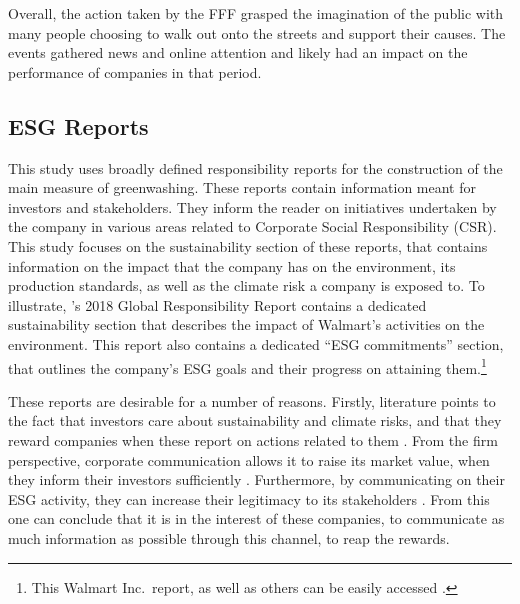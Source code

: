 \documentclass[12pt]{article}
\begin{document}
Overall, the action taken by the FFF grasped the imagination of the public with many people choosing to walk out onto the streets and support their causes. The events gathered news and online attention and likely had an impact on the performance of companies in that period.


\subsection{ESG Reports}


This study uses broadly defined responsibility reports for the construction of the main measure of greenwashing. These reports contain information meant for investors and stakeholders. They inform the reader on initiatives undertaken by the company in various areas related to Corporate Social Responsibility (CSR). This study focuses on the sustainability section of these reports, that contains information on the impact that the company has on the environment, its production standards, as well as the climate risk a company is exposed to. To illustrate, \citeauthor{walmart2018csr}'s 2018 Global Responsibility Report contains a dedicated sustainability section that describes the impact of Walmart's activities on the environment. This report also contains a dedicated ``ESG commitments'' section, that outlines the company's ESG goals and their progress on attaining them.\footnote{This Walmart Inc.~report, as well as others can be easily accessed \href{https://www.responsibilityreports.com/Company/walmart-inc}{}.}

These reports are desirable for a number of reasons. Firstly, literature points to the fact that investors care about sustainability and climate risks, and that they reward companies when these report on actions related to them \parencite{ilhanClimateRiskDisclosure2023,kruegerImportanceClimateRisks2020,pastorSustainableInvestingEquilibrium2021,testaDoesItPay2018}. From the firm perspective, corporate communication allows it to raise its market value, when they inform their investors sufficiently \parencite{servaesImpactCorporateSocial2013}. Furthermore, by communicating on their ESG activity, they can increase their legitimacy to its stakeholders \parencite{torelliGreenwashingEnvironmentalCommunication2020}. From this one can conclude that it is in the interest of these companies, to communicate as much information as possible through this channel, to reap the rewards. 
\end{document}
